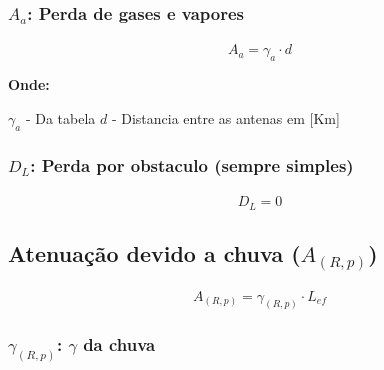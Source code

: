 \documentclass[11pt]{article} %
\begin{document}
\subsubsection{$A_{a}$: Perda de gases e vapores}

\paragraph{}

\begin{equation}
A_{a} = {\gamma}_{a} \cdot d
\end{equation}

\textbf{Onde:}

$\gamma_{a}$ - Da tabela \newline
$d$ - Distancia entre as antenas em [Km]

\subsubsection{$D_{L}$: Perda por obstaculo (sempre simples)}

\paragraph{}

\begin{equation}
D_{L} = 0
\end{equation}

\subsection{Atenuação devido a chuva ($A_{(R, p)}$)}

\paragraph{}

\begin{equation}
A_{(R, p)} = {\gamma}_{(R, p)} \cdot L_{ef}
\end{equation}

\subsubsection{${\gamma}_{(R, p)}$: $\gamma$ da chuva}

\paragraph{}
\end{document}

